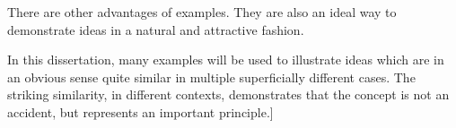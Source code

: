 There are other advantages of examples. They are also an ideal way to demonstrate ideas in a 
natural and attractive fashion.

In this dissertation, many examples will be used to illustrate ideas which are in an obvious
sense quite similar in multiple superficially different cases. The striking similarity, in
different contexts, demonstrates that the concept is not an accident, but represents an important
principle.]

\fi
